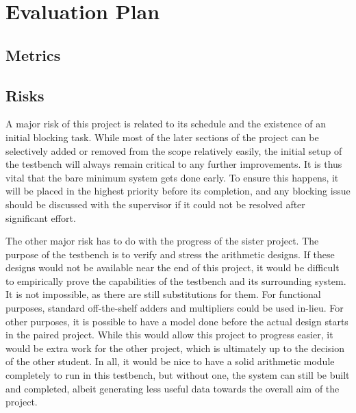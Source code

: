\section{Evaluation Plan}

\subsection{Metrics}

\subsection{Risks}
A major risk of this project is related to its schedule and the existence of an
initial blocking task.
While most of the later sections of the project can be selectively added or
removed from the scope relatively easily, the initial setup of the testbench
will always remain critical to any further improvements.
It is thus vital that the bare minimum system gets done early.
To ensure this happens, it will be placed in the highest priority before its
completion, and any blocking issue should be discussed with the supervisor if it
could not be resolved after significant effort.

The other major risk has to do with the progress of the sister project.
The purpose of the testbench is to verify and stress the arithmetic designs.
If these designs would not be available near the end of this project,
it would be difficult to empirically prove the capabilities of the testbench
and its surrounding system.
It is not impossible, as there are still substitutions for them.
For functional purposes, standard off-the-shelf adders and multipliers could be
used in-lieu.
For other purposes, it is possible to have a model done before the actual design
starts in the paired project.
While this would allow this project to progress easier, it would be extra work
for the other project, which is ultimately up to the decision of the other
student.
In all, it would be nice to have a solid arithmetic module completely to run
in this testbench, but without one, the system can still be built and completed,
albeit generating less useful data towards the overall aim of the project.